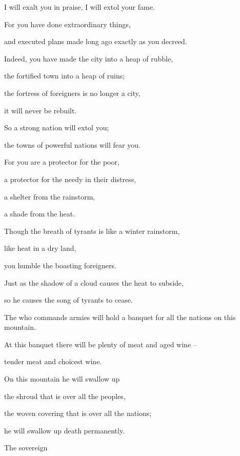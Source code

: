 {\par }{\Q I will exalt
you
in praise,
I will extol your fame.
\par }{\Q For
you have done
extraordinary
things,
\par }{\Q and executed plans
made long ago exactly as you decreed.
\par }{\Q {}Indeed,
you have made
the city
into a heap
of rubble,
\par }{\Q the fortified
town
into a heap of ruins;
\par }{\Q the fortress
of foreigners
is no longer a
city,
\par }{\Q it will
never
be
rebuilt.
\par }{\Q {}So
a strong
nation
will extol
you;
\par }{\Q the towns
of powerful nations
will fear you.
\par }{\Q {}For
you are a protector
for the poor,
\par }{\Q a protector
for the needy
in their distress,
\par }{\Q a shelter
from the rainstorm,
\par }{\Q a shade
from the heat.
\par }{\Q Though
the breath
of tyrants
is like a winter rainstorm,
\par }{\Q {}like heat
in a dry land,
\par }{\Q you humble
the boasting
foreigners.
\par }{\Q Just as the shadow
of a cloud
causes the heat
to subside,

\par }{\Q so he causes the song
of tyrants
to cease.
\par }{\Q {}The
{}
who commands armies
will hold
a banquet
for all
the nations
on this mountain.
\par }{\Q At this
banquet
there
will be plenty of meat
and aged wine
–
\par }{\Q tender meat
and choicest wine.
\par }{\Q {}On this
mountain
he will swallow up
\par }{\Q the shroud
that is over
all
the peoples,
\par }{\Q the woven
covering
that is over
all
the nations;
\par }{\Q {}he will swallow
up death
permanently.
\par }{\Q The sovereign

}
